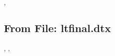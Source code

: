 \documentclass{l3in2edoc}
\begin{document}
\begin{function}[]
  {
    \NewStructureName
  }

\end{function}


\begin{function}[]
  {
    \UseStructureName
  }

\end{function}



\begin{function}[user]
  {
    \DebugTablesOn,
    \DebugTablesOff
  }
  \begin{syntax}
  \end{syntax}

\end{function}


\begin{function}[int]
  {
    \hyper@nopatch@longtable
  }

\end{function}



\subsection{From File: ltfinal.dtx}


\begin{variable}[]
  {
    \@lowpenalty,
    \@medpenalty,
    \@highpenalty
  }

\end{variable}


\begin{function}[]
  {
    \newXeTeXintercharclass
  }

\end{function}


\begin{function}[]
  {
    \XeTeXuseglyphmetrics
  }

\end{function}

\begin{function}[]
  {
    \XeTeXdashbreakstate
  }

\end{function}


\begin{function}[TF]
  {
    \IfPDFManagementActive
  }

\end{function}
\end{document}
